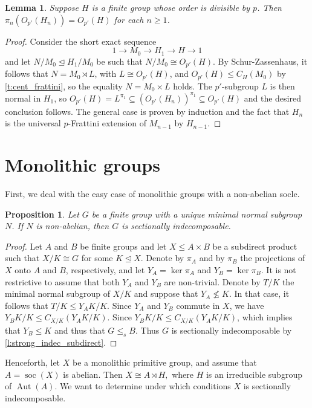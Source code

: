 \documentclass[10pt,a4paper]{amsart}
\newtheorem{lemma}[thm]{Lemma}
\newtheorem{proposition}[thm]{Proposition}
\DeclareMathOperator{\soc}{soc}
\DeclareMathOperator{\aut}{Aut}
\begin{document}
\begin{lemma}\label{l:o_p'}
    Suppose $H$ is a finite group whose order is divisible by $p$. Then $\pi_n(O_{p'}(H_n)) = O_{p'}(H)$ for each $n\geq 1$.
\end{lemma}
\begin{proof}
    Consider the short exact sequence
    \[1 \rightarrow M_0 \rightarrow H_1 \rightarrow H \rightarrow 1\]
    and let $N/M_0 \unlhd H_1/M_0$ be such that $N/M_0 \cong O_{p'}(H)$. By Schur-Zassenhaus, it follows that $N=M_0 \rtimes L$, with $L \cong O_{p'}(H)$, and  $O_{p'}(H)\leq C_H(M_0)$ by \cref{t:cent_frattini}, so the equality $N=M_0 \times L$ holds. The $p'$-subgroup $L$ is then normal in $H_1$, so $O_{p'}(H) = L^{\pi_1} \subseteq (O_{p'}(H_n))^{\pi_1}\subseteq O_{p'}(H)$ and the desired conclusion follows. The general case is proven by induction and the fact that $H_n$ is the universal $p$-Frattini extension of $M_{n-1}$ by $H_{n-1}$.
\end{proof}

\section{Monolithic groups}\label{sec:monolithic}

First, we deal with the easy case of monolithic groups with a non-abelian socle.

\begin{proposition}\label{p:mono_non-abelian}
	Let $G$ be a finite group with a unique minimal normal subgroup $N$. If $N$ is non-abelian, then $G$ is sectionally indecomposable.
\end{proposition}
\begin{proof}
	Let $A$ and $B$ be finite groups and let $X \leq A \times B$ be a subdirect product such that $X/K \cong G$ for some $K \unlhd X$. Denote by $\pi_A$ and by $\pi_B$ the projections of $X$ onto $A$ and $B$, respectively, and let $Y_A = \ker \pi_A$ and $Y_B = \ker \pi_B$. It is not restrictive to assume that both $Y_A$ and $Y_B$ are non-trivial. Denote by $T/K$ the minimal normal subgroup of $X/K$ and suppose that $Y_A \not\leq K$. In that case, it follows that $T/K \leq Y_AK/K$. Since $Y_A$ and $Y_B$ commute in $X$, we have $Y_BK/K \leq C_{X/K}(Y_AK/K)$. Since $Y_BK/K \leq C_{X/K}(Y_AK/K)$,  which implies that $Y_B \leq K$ and thus that $G \leq_s B$.  Thus $G$ is sectionally indecomposable by \cref{l:strong_indec_subdirect}.
\end{proof}

Henceforth, let $X$ be a monolithic primitive group, and assume that $A=\soc(X)$ is abelian. Then $X\cong A\rtimes H,$ where $H$ is an irreducible subgroup of $\aut(A).$ We want to determine under which conditions $X$ is sectionally indecomposable.
\end{document}
